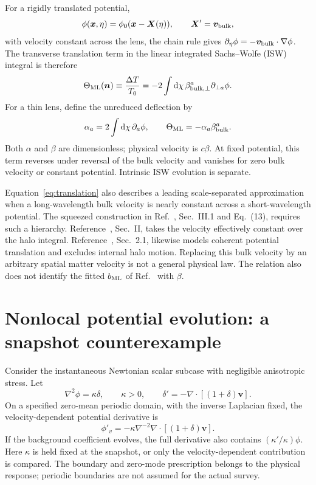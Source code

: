 \documentclass[aps,prd,reprint,onecolumn,notitlepage,nofootinbib]{revtex4-2}
\newcommand{\dd}{\mathrm d}
\newcommand{\vect}[1]{\boldsymbol{#1}}
\begin{document}
For a rigidly translated potential,
\begin{equation}
 \phi(\vect x,\eta)=\phi_0(\vect x-\vect X(\eta)),
 \qquad \vect X'=\vect v_{\rm bulk},
\end{equation}
with velocity constant across the lens, the chain rule gives
$\partial_\eta\phi=-\vect v_{\rm bulk}\cdot\nabla\phi$.
The transverse translation term in the linear integrated Sachs--Wolfe (ISW) integral is therefore
\begin{equation}\label{eq:translation}
 \Theta_{\rm ML}(\vect n)\equiv\frac{\Delta T}{T_0}
 =-2\int\dd\chi\,\beta_{{\rm bulk},\perp}^{a}
       \partial_{\perp a}\phi.
\end{equation}
For a thin lens, define the unreduced deflection by
\begin{equation}
 \alpha_a=2\int\dd\chi\,\partial_a\phi,
 \qquad \Theta_{\rm ML}=-\alpha_a\beta_{\rm bulk}^{a}.
\end{equation}
Both $\alpha$ and $\beta$ are dimensionless; physical velocity is $c\beta$. At fixed potential, this term reverses under reversal of the bulk velocity and vanishes for zero bulk velocity or constant potential. Intrinsic ISW evolution is separate.

Equation~\eqref{eq:translation} also describes a leading scale-separated approximation when a long-wavelength bulk velocity is nearly constant across a short-wavelength potential. The squeezed construction in Ref.~\cite{actdesi}, Sec.~III.1 and Eq.~(13), requires such a hierarchy. Reference~\cite{hotinli2020}, Sec.~II, takes the velocity effectively constant over the halo integral. Reference~\cite{wayland2026}, Sec.~2.1, likewise models coherent potential translation and excludes internal halo motion. Replacing this bulk velocity by an arbitrary spatial matter velocity is not a general physical law. The relation also does not identify the fitted $b_{\rm ML}$ of Ref.~\cite{actdesi} with $\beta$.

\section{Nonlocal potential evolution: a snapshot counterexample}

Consider the instantaneous Newtonian scalar subcase with negligible anisotropic stress. Let
\begin{equation}
 \nabla^2\phi=\kappa\delta,\qquad \kappa>0,
 \qquad \delta'=-\nabla\cdot[(1+\delta)\vect v].
\end{equation}
On a specified zero-mean periodic domain, with the inverse Laplacian fixed, the velocity-dependent potential derivative is
\begin{equation}\label{eq:poisson}
 \phi'_v=-\kappa\nabla^{-2}\nabla\cdot[(1+\delta)\vect v].
\end{equation}
If the background coefficient evolves, the full derivative also contains
$(\kappa'/\kappa)\phi$. Here $\kappa$ is held fixed at the snapshot, or only the velocity-dependent contribution is compared. The boundary and zero-mode prescription belongs to the physical response; periodic boundaries are not assumed for the actual survey.
\end{document}
